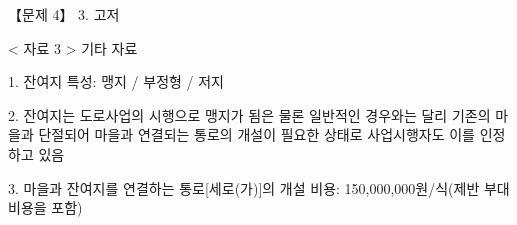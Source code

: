 \begin{longquestion}{【문제 4】}
3. 고저 \par
{\small\centering
{}\par}

< 자료 3 > 기타 자료 \par
1. 잔여지 특성: 맹지 / 부정형 / 저지 \par
2. 잔여지는 도로사업의 시행으로 맹지가 됨은 물론 일반적인 경우와는 달리 기존의 마을과 단절되어 마을과 연결되는 통로의 개설이 필요한 상태로 사업시행자도 이를 인정하고 있음 \par
3. 마을과 잔여지를 연결하는 통로[세로(가)]의 개설 비용: 150,000,000원/식(제반 부대비용을 포함) \par
\end{longquestion}

